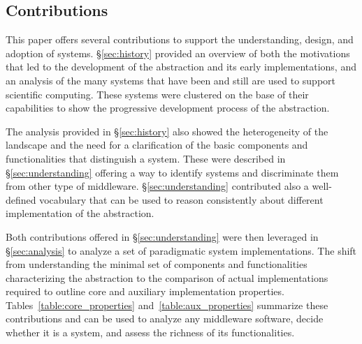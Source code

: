 \documentclass{sig-alternate}
\begin{document}
\subsection{Contributions}
\label{sec:contributions}



This paper offers several contributions to support the understanding, design,
and adoption of \pilot systems. \S\ref{sec:history} provided an overview of both
the motivations that led to the development of the \pilot abstraction and its
early implementations, and an analysis of the many \pilot systems that have been
and still are used to support scientific computing. These systems were clustered
on the base of their capabilities to show the progressive development process of
the \pilot abstraction.

The analysis provided in \S\ref{sec:history} also showed the heterogeneity of
the \pilot landscape and the need for a clarification of the basic components
and functionalities that distinguish a \pilot system. These were described in
\S\ref{sec:understanding} offering a way to identify \pilot systems and
discriminate them from other type of middleware. \S\ref{sec:understanding}
contributed also a well-defined vocabulary that can be used to reason
consistently about different implementation of the \pilot abstraction.

Both contributions offered in \S\ref{sec:understanding} were then leveraged in
\S\ref{sec:analysis} to analyze a set of paradigmatic \pilot system
implementations. The shift from understanding the minimal set of components and
functionalities characterizing the \pilot abstraction to the comparison of
actual \pilot implementations required to outline core and auxiliary
implementation properties. Tables~\ref{table:core_properties}
and~\ref{table:aux_properties} summarize these contributions and can be used to
analyze any middleware software, decide whether it is a \pilot system, and
assess the richness of its functionalities.
\end{document}
